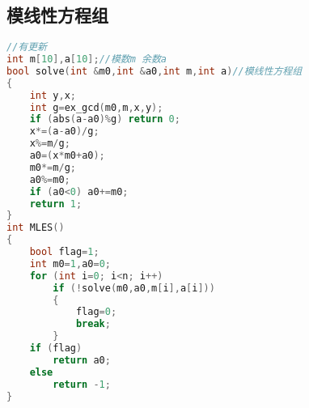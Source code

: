 \subsection{模线性方程组}
	\begin{lstlisting}[language=c++]
//有更新
int m[10],a[10];//模数m 余数a
bool solve(int &m0,int &a0,int m,int a)//模线性方程组
{
	int y,x;
	int g=ex_gcd(m0,m,x,y);
	if (abs(a-a0)%g) return 0;
	x*=(a-a0)/g;
	x%=m/g;
	a0=(x*m0+a0);
	m0*=m/g;
	a0%=m0;
	if (a0<0) a0+=m0;
	return 1;
}
int MLES()
{
	bool flag=1;
	int m0=1,a0=0;
	for (int i=0; i<n; i++)
		if (!solve(m0,a0,m[i],a[i]))
		{
			flag=0;
			break;
		}
	if (flag)
		return a0;
	else
		return -1;
}
	\end{lstlisting}